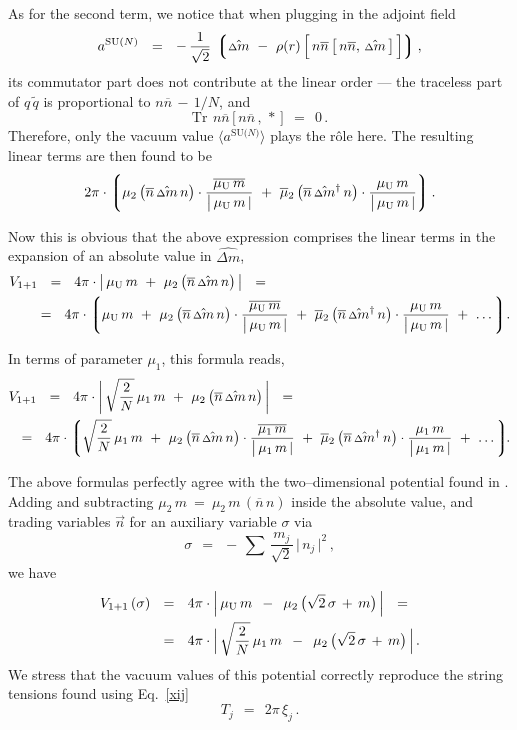 \documentclass[12pt]{article}
\def\beq{\begin{equation}}
\def\eeq{\end{equation}}
\newcommand{\wt}{\widetilde}
\newcommand{\ov}{\overline}
\newcommand{\lgr}{\left\lgroup}
\newcommand{\rgr}{\right\rgroup}
\newcommand{\aN}{a^\text{SU($N$)}}
\newcommand{\nbar}{\ov{n}}
\newcommand{\nnbar}{n\ov{n}}
\newcommand{\muU}{\mu_\text{U}}
\newcommand{\qt}{\wt{q}}
\newcommand{\Tr}{\text{Tr}}
\newcommand{\dm}{\hat{{\scriptstyle \Delta} m}}
\newcommand{\dmdag}{\hat{{\scriptstyle \Delta} m}{}^\dag}
\begin{document}
	As for the second term, we notice that when plugging in the adjoint field 
\[
	\aN    ~~=~~    
	-\, \frac{1}{\sqrt{2}}\, 
	\lgr \dm  ~-~  \rho(r)\, \Big[\, \nnbar\, \big[\, \nnbar,\, \dm \,\big] \,\Big] \rgr,
\]
	its commutator part does not contribute at the linear order --- 
	the traceless part of $ q\, \qt $ is proportional to $ \nnbar \,-\, 1/N $, and
\[
	\Tr~\, \nnbar \, \big[\, \nnbar \,,\, * \,\big]    ~~=~~    0\,.
\]
	Therefore, only the vacuum value $ \langle \aN \rangle $ plays the r\^ole here.
	The resulting linear terms are then found to be 
\beq
	2\pi \cdot 
	\lgr
		\mu_2\, \big(\nbar\, \dm\, n\big) \cdot \frac{\ov{\muU\, m}}{\big|\, \muU\, m \,|}
		~+~
		\ov{\mu}{}_2\, \big(\nbar\, \dmdag\, n\big) \cdot \frac{\muU\, m}{\big|\, \muU\, m \,|}
	\rgr.
\eeq

	Now this is obvious that the above expression comprises the linear terms in the expansion of
	an absolute value in $ \dm $,
\begin{align}
%
	&
	V_{1+1}    ~~=~~    4 \pi \cdot \big|\, \muU\, m  ~+~  \mu_2\, \big(\nbar\, \dm\, n\big) \,\big|    ~~=~~    
	\\
%
\notag
	&
	\quad~
	~~=~~
	4 \pi \cdot 
	\lgr
		\muU\, m  
		~+~
		\mu_2\, \big(\nbar\, \dm\, n\big) \cdot \frac{\ov{\muU\, m}}{\big|\, \muU\, m \,|}
		~+~
		\ov{\mu}{}_2\, \big(\nbar\, \dmdag\, n\big) \cdot \frac{\muU\, m}{\big|\, \muU\, m \,|}
		~+~
		\dots
	\rgr\!.
\end{align}

	In terms of parameter $ \mu_1 $, this formula reads,
\begin{align}
%
	&
	V_{1+1}    ~~=~~    4 \pi \cdot \bigg|\, \sqrt{\frac{2}{N}}\,\mu_1\, m  ~+~  \mu_2\, \big(\nbar\, \dm\, n\big) \,\bigg|    ~~=~~    
	\\
%
\notag
	&
	~~=~~
	4 \pi \cdot 
	\lgr
		\sqrt{\frac{2}{N}}\,\mu_1\, m  
		~+~
		\mu_2\, \big(\nbar\, \dm\, n\big) \cdot \frac{\ov{\mu_1\, m}}{\big|\, \mu_1\, m \,|}
		~+~
		\ov{\mu}{}_2\, \big(\nbar\, \dmdag\, n\big) \cdot \frac{\mu_1\, m}{\big|\, \mu_1\, m \,|}
		~+~
		\dots
	\rgr\!\!.
\end{align}

	The above formulas perfectly agree with the two--dimensional potential found in \cite{Shifman:2010kr}.
	Adding and subtracting $ \mu_2\, m ~=~ \mu_2\, m\, (\nbar\, n) $ inside the absolute value,
	and trading variables $ \vec{n} $ for an auxiliary variable $ \sigma $ via
\beq
	\sigma    ~~=~~    -\, \sum\, \frac{m_j}{\sqrt{2}}\, \big|\, n_j \,\big|^2\,,
\eeq
	we have
\begin{align}
%
	\notag
	V_{1+1}\, (\sigma)    & ~~=~~    4 \pi \cdot \Big|\, \muU\, m  \,~-~\,  \mu_2\, \big( \sqrt{2}\,\sigma \,+\, m \big) \,\Big|    ~~=~~    
	\\
%
\label{Vdeform}
	& ~~=~~
	4 \pi \cdot \Big|\, \sqrt{\frac{2}{N}}\,\mu_1\, m  \,~-~\,  \mu_2\, \big( \sqrt{2}\,\sigma \,+\, m \big) \,\Big|\,.
\end{align}
	We stress that the vacuum values of this potential correctly reproduce the string tensions 
	found using Eq.~\eqref{xij}
\beq
	T_j    ~~=~~    2\pi\, \xi_j\,.
\eeq
\end{document}
